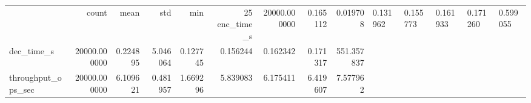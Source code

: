 \begin{tabular}{lrrrrrrrr}
\toprule
 & count & mean & std & min & 25%
\midrule
enc_time_s & 20000.000000 & 0.165112 & 0.019708 & 0.131962 & 0.155773 & 0.161933 & 0.171260 & 0.599055 \\
dec_time_s & 20000.000000 & 0.224895 & 5.046064 & 0.127745 & 0.156244 & 0.162342 & 0.171317 & 551.357837 \\
throughput_ops_sec & 20000.000000 & 6.109621 & 0.481957 & 1.669296 & 5.839083 & 6.175411 & 6.419607 & 7.577962 \\
\bottomrule
\end{tabular}
